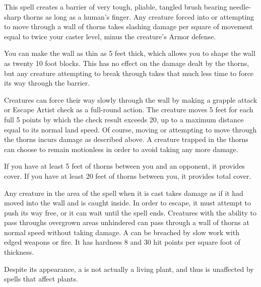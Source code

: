 \spelldur{\durlong \dismissable}
\spelleffect This spell creates a barrier of very tough, pliable, tangled brush bearing needle-sharp thorns as long as a human's finger. Any creature forced into or attempting to move through a wall of thorns takes slashing damage per square of movement equal to twice your caster level, minus the creature's Armor defense.
\par You can make the wall as thin as 5 feet thick, which allows you to shape the wall as twenty 10 foot blocks. This has no effect on the damage dealt by the thorns, but any creature attempting to break through takes that much less time to force its way through the barrier.
\par Creatures can force their way slowly through the wall by making a grapple attack or Escape Artist check as a full-round action. The creature moves 5 feet for each full 5 points by which the check result exceeds 20, up to a maximum distance equal to its normal land speed. Of course, moving or attempting to move through the thorns incurs damage as described above. A creature trapped in the thorns can choose to remain motionless in order to avoid taking any more damage.
\par If you have at least 5 feet of thorns between you and an opponent, it provides cover. If you have at least 20 feet of thorns between you, it provides total cover.
\par Any creature in the area of the spell when it is cast takes damage as if it had moved into the wall and is caught inside. In order to escape, it must attempt to push its way free, or it can wait until the spell ends. Creatures with the ability to pass throughs overgrown areas unhindered can pass through a wall of thorns at normal speed without taking damage.
\spellnotes A  can be breached by slow work with edged weapons or fire. It has hardness 8 and 30 hit points per square foot of thickness.
\par Despite its appearance, a  is not actually a living plant, and thus is unaffected by spells that affect plants.

